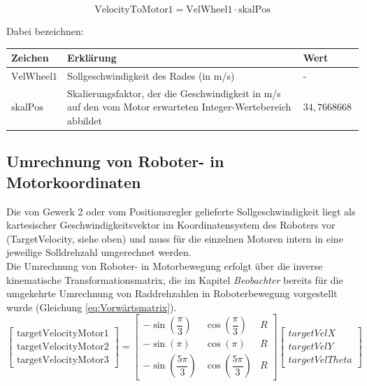 \begin{equation}
    \text{VelocityToMotor1} = \text{VelWheel1} \cdot \text{skalPos}
\end{equation}

Dabei bezeichnen:
\begin{table}[H]
    \centering    
    \label{tab:VelocityToMotor_Formelzeichen}
    \begin{tabularx}{\textwidth}{|l|X|l|}
        \hline
        \textbf{Zeichen} & \textbf{Erklärung} & \textbf{Wert} \\
        \hline
        $\text{VelWheel1}$ & Sollgeschwindigkeit des Rades (in m/s) & - \\
        \hline
        $\text{skalPos}$ & Skalierungsfaktor, der die Geschwindigkeit in m/s auf den vom Motor erwarteten Integer-Wertebereich abbildet & $34{,}7668668\ $ \\
        \hline        
    \end{tabularx}
\end{table}

\subsection{Umrechnung von Roboter- in Motorkoordinaten}
Die von Gewerk 2 oder vom Positionsregler gelieferte Sollgeschwindigkeit liegt als kartesischer Geschwindigkeitsvektor im Koordinatensystem des Roboters vor (TargetVelocity, siehe oben) und muss für die einzelnen Motoren intern in eine jeweilige Solldrehzahl umgerechnet werden. \\


Die Umrechnung von Roboter- in Motorbewegung erfolgt über die inverse kinematische Transformationsmatrix, die im Kapitel \textit{Beobachter} bereits für die umgekehrte Umrechnung von Raddrehzahlen in Roboterbewegung vorgestellt wurde (Gleichung \ref{eq:Vorwärtsmatrix}). 
\begin{equation}
    \begin{bmatrix}
        \text{targetVelocityMotor1} \\
        \text{targetVelocityMotor2} \\
        \text{targetVelocityMotor3}
    \end{bmatrix}
    =
    \begin{bmatrix}
        -\sin\left(\dfrac{\pi}{3}\right) & \cos\left(\dfrac{\pi}{3}\right) & R \\[8pt]
        -\sin\left(\pi\right) & \cos\left(\pi\right) & R \\[8pt]
        -\sin\left(\dfrac{5\pi}{3}\right) & \cos\left(\dfrac{5\pi}{3}\right) & R
    \end{bmatrix}
    \begin{bmatrix}
        targetVelX\\
        targetVelY \\
        targetVelTheta
    \end{bmatrix}
\end{equation}

